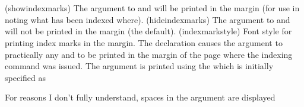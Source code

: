 \begin{syntax}
\cmd{\showindexmarks} \cmd{\hideindexmarks} \\
\cmd{\indexmarkstyle} \\
\end{syntax}
\glossary(showindexmarks)%
  {}%
  {The  argument to  and  will
   be printed in the margin (for use in noting what has been indexed where).}
\glossary(hideindexmarks)%
  {}%
  {The  argument to  and  will
   not be printed in the margin (the default).}
\glossary(indexmarkstyle)%
  {}%
  {Font style for printing index marks in the margin.}
The declaration \cmd{\showindexmarks} causes the argument to practically 
any \cmd{\index} and \cmd{\specialindex} to be 
printed in the margin of the
page where the indexing command was issued. The argument is printed using
the \cmd{\indexmarkstyle} which is initially specified as
\begin{lcode}
\indexmarkstyle{\normalfont\footnotesize\ttfamily}
\end{lcode}
For reasons I don't fully understand, spaces in the argument are displayed
